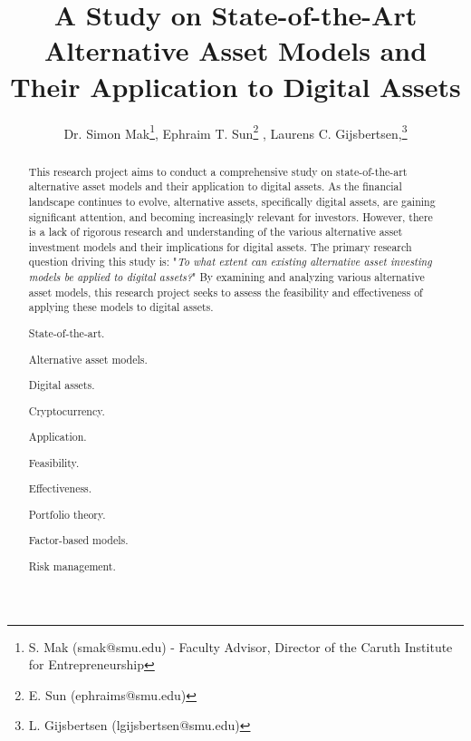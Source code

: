 \documentclass{ledger}
\title{A Study on State-of-the-Art Alternative Asset Models and Their Application to Digital Assets
}
\author{Dr. Simon Mak\thanks{S. Mak (smak@smu.edu) - Faculty Advisor, Director of the Caruth Institute for Entrepreneurship}, Ephraim T. Sun\thanks{E. Sun (ephraims@smu.edu)} , Laurens C. Gijsbertsen,\thanks{L. Gijsbertsen (lgijsbertsen@smu.edu)}}
\begin{document}
\maketitle

\thispagestyle{pagefirst}

\begin{abstract}
This research project aims to conduct a comprehensive study on state-of-the-art alternative asset models and their application to digital assets. As the financial landscape continues to evolve, alternative assets, specifically digital assets, are gaining significant attention, and becoming increasingly relevant for investors. However, there is a lack of rigorous research and understanding of the various alternative asset investment models and their implications for digital assets. The primary research question driving this study is: "\textit{To what extent can existing alternative asset investing models be applied to digital assets?}" By examining and analyzing various alternative asset models, this research project seeks to assess the feasibility and effectiveness of applying these models to digital assets.

\begin{keywords}
\item State-of-the-art.
\item Alternative asset models.
\item Digital assets.
\item Cryptocurrency.
\item Application.
\item Feasibility.
\item Effectiveness.
\item Portfolio theory.
\item Factor-based models.
\item Risk management.
\end{keywords}
\end{abstract}













\ledgernotes
\end{document}
